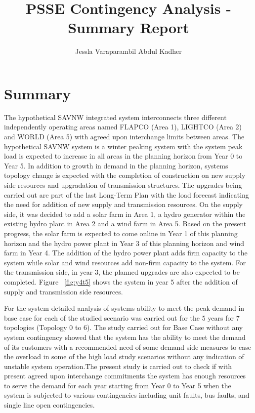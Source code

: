 \documentclass[10pt]{report}
\title{PSSE Contingency Analysis - Summary Report}
\author{Jessla Varaparambil Abdul Kadher}
\begin{document}
\maketitle

\tableofcontents
\listoffigures
\listoftables

\newpage

\chapter*{Summary}
\label{chapter:sum}
The hypothetical SAVNW integrated system interconnects three different independently operating areas named FLAPCO (Area 1), LIGHTCO (Area 2) and WORLD (Area 5) with agreed upon interchange limits between areas. The hypothetical SAVNW system is a winter peaking system with the system peak load is expected to increase in all areas in the planning horizon from Year 0 to Year 5. In addition to growth in demand in the planning horizon, systems topology change is expected with the completion of construction on new supply side resources and upgradation of transmission structures. The upgrades being carried out are part of the last Long-Term Plan with the load forecast indicating the need for addition of new supply and transmission resources. On the supply side, it was decided to add a solar farm in Area 1, a hydro generator within the existing hydro plant in Area 2 and a wind farm in Area 5. Based on the present progress, the solar farm is expected to come online in Year 1 of this planning horizon and the hydro power plant in Year 3 of this planning horizon and wind farm in Year 4. The addition of the hydro power plant adds firm capacity to the system while solar and wind resources add non-firm capacity to the system. For the transmission side, in year 3, the planned upgrades are also expected to be completed. Figure ~\ref{fig:y4t5} shows the system in year 5 after the addition of supply and transmission side resources. 

For the system detailed analysis of systems ability to meet the peak demand in base case for each of the studied scenario was carried out for the 5 years for 7 topologies (Topology 0 to 6). The study carried out for Base Case without any system contingency showed that the system has the ability to meet the demand of its customers with a recommended need of some demand side measures to ease the overload in some of the high load study scenarios without any indication of unstable system operation.The present study is carried out to check if with present agreed upon interchange commitments the system has enough resources to serve the demand for each year starting from Year 0 to Year 5 when the system is subjected to various contingencies including unit faults, bus faults, and single line open contingencies. 
\end{document}
